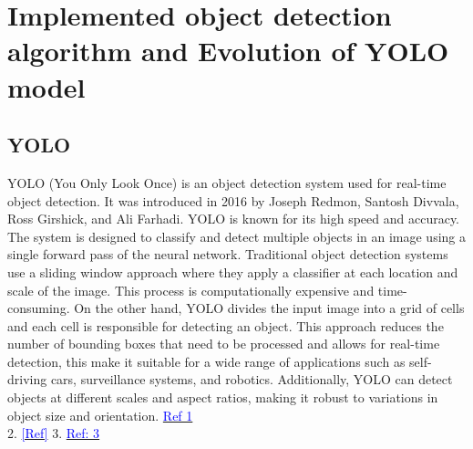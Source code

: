 \section{Implemented object detection algorithm and Evolution of YOLO model} \vspace{-2em}
\subsection{YOLO}
YOLO (You Only Look Once) is an object detection system used for real-time object detection. It was introduced in 2016 by Joseph Redmon, Santosh Divvala, Ross Girshick, and Ali Farhadi. YOLO is known for its high speed and accuracy. The system is designed to classify and detect multiple objects in an image using a single forward pass of the neural network.
Traditional object detection systems use a sliding window approach where they apply a classifier at each location and scale of the image. This process is computationally expensive and time-consuming. On the other hand, YOLO divides the input image into a grid of cells and each cell is responsible for detecting an object. This approach reduces the number of bounding boxes that need to be processed and allows for real-time detection, this make it suitable for a wide range of applications such as self-driving cars, surveillance systems, and robotics. Additionally, YOLO can detect objects at different scales and aspect ratios, making it robust to variations in object size and orientation. \cite{terven2023comprehensive} \cite{redmon2016you} \href{https://deci.ai/blog/history-yolo-object-detection-models-from-yolov1-yolov8/}{\textcolor{blue}{Ref 1}}\\
2. \href{https://deci.ai/blog/yolov8-vs-yolo-nas-showdown-exploring-advanced-object-detection/}{\textcolor{blue}{[Ref]}}
3. \href{https://arxiv.org/pdf/2304.00501.pdf}{\textcolor{blue}{Ref: 3}}

